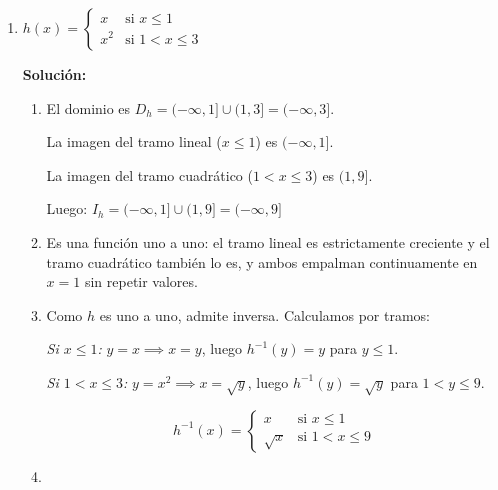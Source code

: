 \documentclass[12pt]{article}
\begin{document}
\begin{enumerate}[label=\alph*.-]
\item $h(x) = \begin{cases} x & \text{si } x \leq 1 \\ x^2 & \text{si } 1 < x \leq 3 \end{cases}$

\textbf{Solución:}

\begin{enumerate}[label=\roman*.]
    \item El dominio es $D_h = (-\infty, 1] \cup (1, 3] = (-\infty, 3]$.

    La imagen del tramo lineal ($x \leq 1$) es $(-\infty, 1]$.

    La imagen del tramo cuadrático ($1 < x \leq 3$) es $(1, 9]$.

    Luego: $I_h = (-\infty, 1] \cup (1, 9] = (-\infty, 9]$

    \item Es una función uno a uno: el tramo lineal es estrictamente creciente y el tramo cuadrático también lo es, y ambos empalman continuamente en $x = 1$ sin repetir valores.

    \item Como $h$ es uno a uno, admite inversa. Calculamos por tramos:

    \textit{Si $x \leq 1$:} $y = x \implies x = y$, luego $h^{-1}(y) = y$ para $y \leq 1$.

    \textit{Si $1 < x \leq 3$:} $y = x^2 \implies x = \sqrt{y}$, luego $h^{-1}(y) = \sqrt{y}$ para $1 < y \leq 9$.

    \[
    \boxed{h^{-1}(x) = \begin{cases} x & \text{si } x \leq 1 \\ \sqrt{x} & \text{si } 1 < x \leq 9 \end{cases}}
    \]

    \item
    \begin{figure}[H]
        \centering
\end{figure}
\end{enumerate}
\end{enumerate}
\end{document}
